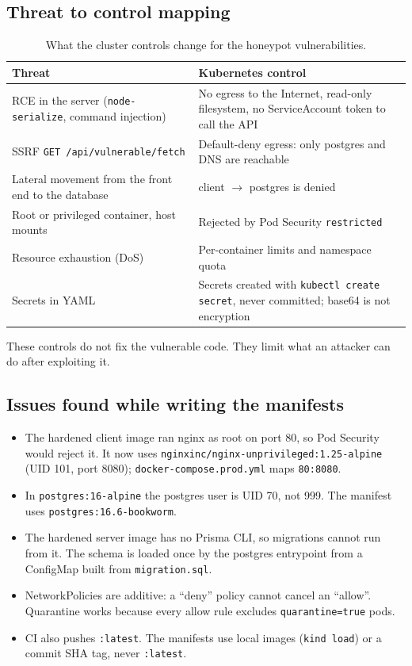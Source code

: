 \documentclass[11pt,a4paper]{article}
\newcommand{\thc}[1]{\textcolor{headtxt}{\textbf{#1}}}
\begin{document}
\subsection{Threat to control mapping}
\begin{table}[H]
\centering
\caption{What the cluster controls change for the honeypot vulnerabilities.}
\begin{tabularx}{\textwidth}{@{}Y Y@{}}
\toprule
{}\thc{Threat} & \thc{Kubernetes control} \\
\midrule
RCE in the server (\texttt{node-serialize}, command injection) & No egress to the Internet, read-only filesystem, no ServiceAccount token to call the API \\
SSRF \texttt{GET /api/vulnerable/fetch} & Default-deny egress: only postgres and DNS are reachable \\
Lateral movement from the front end to the database & client $\rightarrow$ postgres is denied \\
Root or privileged container, host mounts & Rejected by Pod Security \texttt{restricted} \\
Resource exhaustion (DoS) & Per-container limits and namespace quota \\
Secrets in YAML & Secrets created with \texttt{kubectl create secret}, never committed; base64 is not encryption \\
\bottomrule
\end{tabularx}
\end{table}
These controls do not fix the vulnerable code. They limit what an attacker can do after exploiting it.

\subsection{Issues found while writing the manifests}
\begin{itemize}
  \item The hardened client image ran nginx as root on port 80, so Pod Security would reject it. It now uses \texttt{nginxinc/nginx-unprivileged:1.25-alpine} (UID 101, port 8080); \texttt{docker-compose.prod.yml} maps \texttt{80:8080}.
  \item In \texttt{postgres:16-alpine} the postgres user is UID 70, not 999. The manifest uses \texttt{postgres:16.6-bookworm}.
  \item The hardened server image has no Prisma CLI, so migrations cannot run from it. The schema is loaded once by the postgres entrypoint from a ConfigMap built from \texttt{migration.sql}.
  \item NetworkPolicies are additive: a ``deny'' policy cannot cancel an ``allow''. Quarantine works because every allow rule excludes \texttt{quarantine=true} pods.
  \item CI also pushes \texttt{:latest}. The manifests use local images (\texttt{kind load}) or a commit SHA tag, never \texttt{:latest}.
\end{itemize}
\end{document}
